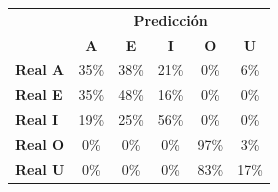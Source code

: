\begin{tabular}{lccccc}
\toprule
 & \multicolumn{5}{c}{\textbf{Predicción}} \\
 & \textbf{A} & \textbf{E} & \textbf{I} & \textbf{O} & \textbf{U} \\
\midrule
\textbf{Real A} & \cellcolor[rgb]{0.75,0.75,1.00}  35\% & \cellcolor[rgb]{0.73,0.73,1.00}  38\% & \cellcolor[rgb]{0.86,0.86,1.00}  21\% & \cellcolor[rgb]{1.00,1.00,1.00}  0\% & \cellcolor[rgb]{0.96,0.96,1.00}  6\% \\
\textbf{Real E} & \cellcolor[rgb]{0.75,0.75,1.00}  35\% & \cellcolor[rgb]{0.66,0.66,1.00}  48\% & \cellcolor[rgb]{0.89,0.89,1.00}  16\% & \cellcolor[rgb]{1.00,1.00,1.00}  0\% & \cellcolor[rgb]{1.00,1.00,1.00}  0\% \\
\textbf{Real I} & \cellcolor[rgb]{0.86,0.86,1.00}  19\% & \cellcolor[rgb]{0.82,0.82,1.00}  25\% & \cellcolor[rgb]{0.61,0.61,1.00} \color{white} 56\% & \cellcolor[rgb]{1.00,1.00,1.00}  0\% & \cellcolor[rgb]{1.00,1.00,1.00}  0\% \\
\textbf{Real O} & \cellcolor[rgb]{1.00,1.00,1.00}  0\% & \cellcolor[rgb]{1.00,1.00,1.00}  0\% & \cellcolor[rgb]{1.00,1.00,1.00}  0\% & \cellcolor[rgb]{0.32,0.32,1.00} \color{white} 97\% & \cellcolor[rgb]{0.98,0.98,1.00}  3\% \\
\textbf{Real U} & \cellcolor[rgb]{1.00,1.00,1.00}  0\% & \cellcolor[rgb]{1.00,1.00,1.00}  0\% & \cellcolor[rgb]{1.00,1.00,1.00}  0\% & \cellcolor[rgb]{0.42,0.42,1.00} \color{white} 83\% & \cellcolor[rgb]{0.88,0.88,1.00}  17\% \\
\bottomrule
\end{tabular}